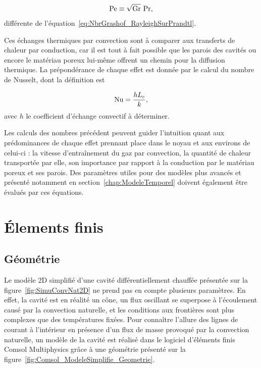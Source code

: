 \begin{equation}
	\mathrm{Pe} \equiv \sqrt{\mathrm{Gr}}~\mathrm{Pr},
	\label{eq:NbrPeclet_GrashofFoisPrandtl}
\end{equation}
différente de l'équation~\eqref{eq:NbrGrashof_RayleighSurPrandtl}.\medskip

Ces échanges thermiques par convection sont à comparer aux transferts de chaleur par conduction, car il est tout à fait possible que les parois des cavités ou encore le matériau poreux lui-même offrent un chemin pour la diffusion thermique. La prépondérance de chaque effet est donnée par le calcul du nombre de Nusselt, dont la définition est

\begin{equation}
	\mathrm{Nu} = \frac{h L_c}{k},
\end{equation}
avec $h$ le coefficient d'échange convectif à déterminer.\bigskip

Les calculs des nombres précédent peuvent guider l'intuition quant aux prédominances de chaque effet prennant place dans le noyau et aux environs de celui-ci : la vitesse d'entraînement du gaz par convection, la quantité de chaleur transportée par elle, son importance par rapport à la conduction par le matériau poreux et ses parois. Des paramètres utiles pour des modèles plus avancés et présenté notamment en section~\ref{chap:ModeleTemporel} doivent également être évalués par ces équations.

\section{\'Elements finis}\label{chap:FEM}
\subsection{Géométrie}
Le modèle 2D simplifié d'une cavité différentiellement chauffée présentée sur la figure~\ref{fig:SimuConvNat2D} ne prend pas en compte plusieurs paramètres. En effet, la cavité est en réalité un cône, un flux oscillant se superpose à l'écoulement causé par la convection naturelle, et les conditions aux frontières sont plus complexes que des températures fixées. Pour connaître l'allure des lignes de courant à l'intérieur en présence d'un flux de masse provoqué par la convection naturelle, un modèle de la cavité est réalisé dans le logiciel d'éléments finis Comsol Multiphysics grâce à une géométrie présenté sur la figure~\ref{fig:Comsol_ModeleSimplifie_Geometrie}.

